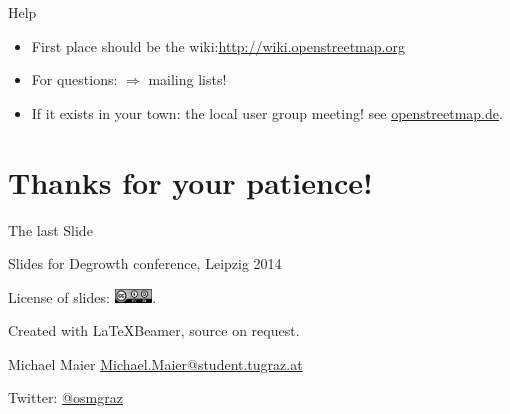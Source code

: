 \documentclass{beamer}
\begin{document}
\begin{frame}{Help}

\begin{itemize}
  \item First place should be the wiki:\url{http://wiki.openstreetmap.org}
  \item For questions: $\Rightarrow$ mailing lists!
\item If it exists in your town: the local user group meeting! see \href{http://usergroups.openstreetmap.de/}{openstreetmap.de}.
\end{itemize}

\end{frame}

\section{Thanks for your patience!}

\begin{frame}{The last Slide}

  Slides for Degrowth conference, Leipzig 2014
\vspace{1cm}

License of slides: \includegraphics[width=1cm]{cc-by-sa.png}.
\vspace{1cm}

Created with \LaTeX Beamer, source on request.
\vspace{1cm}

Michael Maier \href{mailto:michael.maier@student.tugraz.at}{Michael.Maier@student.tugraz.at}

Twitter: \href{https://twitter.com/osmgraz}{@osmgraz}
\end{frame}
\end{document}
